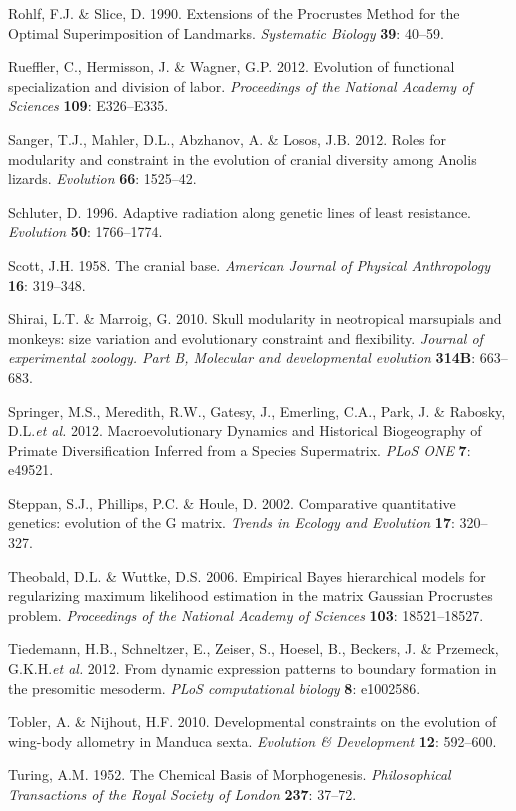 \documentclass[12pt,twoside]{report}
\begin{document}
Rohlf, F.J. \& Slice, D. 1990. Extensions of the Procrustes Method for
the Optimal Superimposition of Landmarks. \emph{Systematic Biology}
\textbf{39}: 40--59.

Rueffler, C., Hermisson, J. \& Wagner, G.P. 2012. Evolution of
functional specialization and division of labor. \emph{Proceedings of
the National Academy of Sciences} \textbf{109}: E326--E335.

Sanger, T.J., Mahler, D.L., Abzhanov, A. \& Losos, J.B. 2012. Roles for
modularity and constraint in the evolution of cranial diversity among
Anolis lizards. \emph{Evolution} \textbf{66}: 1525--42.

Schluter, D. 1996. Adaptive radiation along genetic lines of least
resistance. \emph{Evolution} \textbf{50}: 1766--1774.

Scott, J.H. 1958. The cranial base. \emph{American Journal of Physical
Anthropology} \textbf{16}: 319--348.

Shirai, L.T. \& Marroig, G. 2010. Skull modularity in neotropical
marsupials and monkeys: size variation and evolutionary constraint and
flexibility. \emph{Journal of experimental zoology. Part B, Molecular
and developmental evolution} \textbf{314B}: 663--683.

Springer, M.S., Meredith, R.W., Gatesy, J., Emerling, C.A., Park, J. \&
Rabosky, D.L.\emph{et al.} 2012. Macroevolutionary Dynamics and
Historical Biogeography of Primate Diversification Inferred from a
Species Supermatrix. \emph{PLoS ONE} \textbf{7}: e49521.

Steppan, S.J., Phillips, P.C. \& Houle, D. 2002. Comparative
quantitative genetics: evolution of the G matrix. \emph{Trends in
Ecology and Evolution} \textbf{17}: 320--327.

Theobald, D.L. \& Wuttke, D.S. 2006. Empirical Bayes hierarchical models
for regularizing maximum likelihood estimation in the matrix Gaussian
Procrustes problem. \emph{Proceedings of the National Academy of
Sciences} \textbf{103}: 18521--18527.

Tiedemann, H.B., Schneltzer, E., Zeiser, S., Hoesel, B., Beckers, J. \&
Przemeck, G.K.H.\emph{et al.} 2012. From dynamic expression patterns to
boundary formation in the presomitic mesoderm. \emph{PLoS computational
biology} \textbf{8}: e1002586.

Tobler, A. \& Nijhout, H.F. 2010. Developmental constraints on the
evolution of wing-body allometry in Manduca sexta. \emph{Evolution \&
Development} \textbf{12}: 592--600.

Turing, A.M. 1952. The Chemical Basis of Morphogenesis.
\emph{Philosophical Transactions of the Royal Society of London}
\textbf{237}: 37--72.
\end{document}
